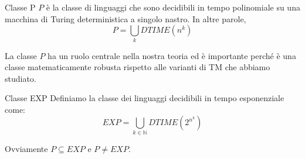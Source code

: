 \begin{Definition}{Classe P}{}
$P$ è la classe di linguaggi che sono decidibili in tempo polinomiale su una macchina di Turing deterministica a singolo nastro. In altre parole,
\begin{equation*}
P = \bigcup_k DTIME(n^k)    
\end{equation*}
\end{Definition}

La classe $P$ ha un ruolo centrale nella nostra teoria ed è importante perché è una classe matematicamente robusta rispetto alle varianti di TM che abbiamo studiato.

\begin{Definition}{Classe EXP}{}
Definiamo la classe dei linguaggi decidibili in tempo esponenziale come:
\begin{equation*}
EXP = \bigcup_{k\in\mathbb{N}}DTIME(2^{n^k})
\end{equation*}

Ovviamente $P\subseteq EXP$ e $P\neq EXP$.
\end{Definition}

